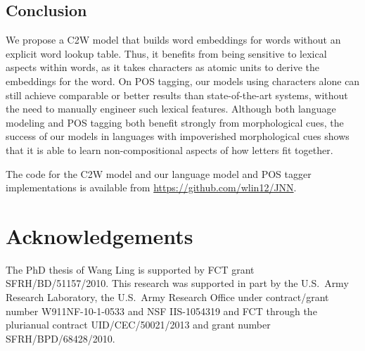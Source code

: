 \documentclass[11pt]{article}
\begin{document}
\begin{CJK*}{UTF8}{gbsn}
{}
\section{Conclusion}
\label{sec:conclusions}

We propose a C2W model that builds word embeddings for words without an explicit word lookup table. Thus, it benefits from being sensitive to lexical aspects within words, as it takes characters as atomic units to derive the embeddings for the word. On POS tagging, our models using characters alone can still achieve comparable or better results than state-of-the-art systems, without the need to manually engineer such lexical features. Although both language modeling and POS tagging both benefit strongly from morphological cues, the success of our models in languages with impoverished morphological cues shows that it is able to learn non-compositional aspects of how letters fit together. 

The code for the C2W model and our language model and POS tagger implementations is available from \url{https://github.com/wlin12/JNN}.

\end{CJK*} 
\section*{Acknowledgements}
The PhD thesis of Wang Ling is supported by FCT grant SFRH/BD/51157/2010.
This research was supported in part by the U.S.~Army Research Laboratory, the U.S.~Army Research Office
under contract/grant number W911NF-10-1-0533 and NSF IIS-1054319 and FCT through the plurianual contract UID/CEC/50021/2013 and grant number SFRH/BPD/68428/2010. 


\end{document}
